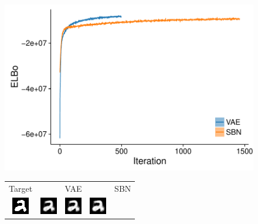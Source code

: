 \begin{figure}
\begin{minipage}{0.5\linewidth}
\centering
\includegraphics[width=\linewidth]{figs/results/vae_sbn/elboProgress.pdf}
\end{minipage}
%
\hspace{2em}
%
\begin{minipage}{0.5\linewidth}
\setlength{\tabcolsep}{1pt}
\centering
\begin{tabular}{c  c c c c c c}
Target & \multicolumn{3}{c}{VAE} & \multicolumn{3}{c}{SBN}
\\
 \includegraphics[width=0.12\linewidth]{figs/results/vae_sbn/vae_encodeDecode_target_000.png}
 \hspace{3pt}
& \includegraphics[width=0.12\linewidth]{figs/results/vae_sbn/vae_encodeDecode_target_000_sample_001.png}
& \includegraphics[width=0.12\linewidth]{figs/results/vae_sbn/vae_encodeDecode_target_000_sample_002.png}
& \includegraphics[width=0.12\linewidth]{figs/results/vae_sbn/vae_encodeDecode_target_000_sample_003.png}

\end{tabular}
\end{minipage}
\end{figure}
